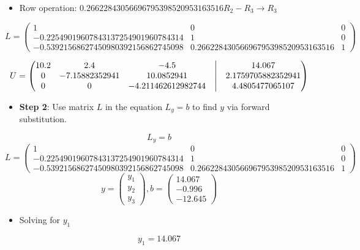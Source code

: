 \documentclass[
]{article}
\providecommand{\tightlist}{%
  \setlength{\itemsep}{0pt}\setlength{\parskip}{0pt}}
\begin{document}
\begin{itemize}
\tightlist
\item
  Row operation:
  \(0.26622843056696795398520953163516R_{2} - R_{3} \rightarrow R_{3}\)
\end{itemize}

\[
   L = 
   \begin{pmatrix}
    1 & 0 & 0 \\
    -0.22549019607843137254901960784314 & 1 & 0 \\
    -0.53921568627450980392156862745098 & 0.26622843056696795398520953163516 & 1 
   \end{pmatrix}
   \]

\[
   U =
   \begin{pmatrix}
    10.2 & 2.4 & -4.5  &\bigm| & 14.067 \\
    0 & -7.15882352941 & 10.0852941  &\bigm| & 2.1759705882352941 \\
    0 & 0 & -4.211462612982744  &\bigm| & 4.4805477065107 
    \end{pmatrix}
   \]

\begin{itemize}
\tightlist
\item
  \textbf{Step 2}: Use matrix \(L\) in the equation \(L_{y} = b\) to
  find \(y\) via forward substitution.
\end{itemize}

\[L_{y} = b\] \[
   L = 
   \begin{pmatrix}
    1 & 0 & 0 \\
    -0.22549019607843137254901960784314 & 1 & 0 \\
    -0.53921568627450980392156862745098 & 0.26622843056696795398520953163516 & 1 
   \end{pmatrix}
   \] \[
   y = 
   \begin{pmatrix}
    y_{1} \\
    y_{2} \\
    y_{3} 
   \end{pmatrix}
   ,
   b = 
   \begin{pmatrix}
    14.067 \\
    -0.996 \\
    -12.645 
   \end{pmatrix}
   \]

\begin{itemize}
\tightlist
\item
  Solving for \(y_{1}\)
\end{itemize}

\[y_{1} = 14.067\]
\end{document}
